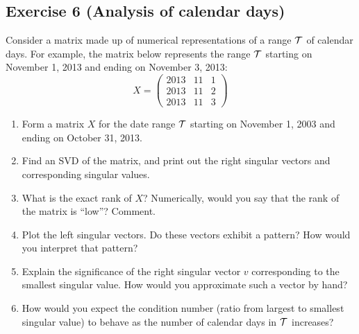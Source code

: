 \documentclass[11pt]{article}
\begin{document}
\newpage
\subsection*{Exercise 6 (Analysis of calendar days)}

Consider a matrix made up of numerical representations of a range ${\cal T}$ of calendar days. For example, the matrix below represents the range ${\cal T}$ starting on November 1, 2013 and ending on November 3, 2013:
\[
X = \left(\begin{array}{ccc}
2013 &         11       &     1       \\
        2013      &     11        &    2     \\
        2013      &     11     &       3     \end{array} \right)
\]
\begin{enumerate}
    \item Form a matrix $X$ for the date range ${\cal T}$ starting on November 1, 2003 and ending on October 31, 2013.
    \item Find an SVD of the matrix, and print out the right singular vectors and corresponding singular values.
    \item What is the exact rank of $X$?  Numerically, would you say that the rank of the matrix is ``low''? Comment.
    \item Plot the left singular vectors. Do these vectors exhibit a pattern? How would you interpret that pattern?
    \item Explain the significance of the right singular vector $v$ corresponding to the smallest singular value. How would you approximate such a vector by hand?
    \item How would you expect the condition number (ratio from largest to smallest singular value) to behave as the number of calendar days in ${\cal T}$ increases?
\end{enumerate}
\end{document}
